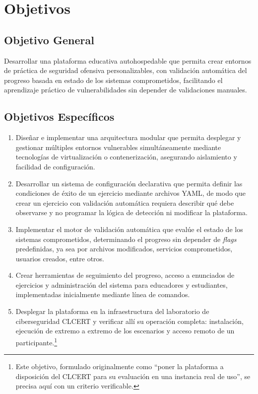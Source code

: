 \section{Objetivos}

\subsection{Objetivo General}

Desarrollar una plataforma educativa autohospedable que permita crear entornos
de práctica de seguridad ofensiva personalizables, con validación automática del
progreso basada en estado de los sistemas comprometidos, facilitando el
aprendizaje práctico de vulnerabilidades sin depender de validaciones manuales.

\subsection{Objetivos Específicos}

\begin{enumerate}
    \item Diseñar e implementar una arquitectura modular que permita desplegar y
    gestionar múltiples entornos vulnerables simultáneamente mediante
    tecnologías de virtualización o contenerización, asegurando aislamiento y
    facilidad de configuración.
    
    \item Desarrollar un sistema de configuración declarativa que permita
    definir las condiciones de éxito de un ejercicio mediante archivos YAML,
    de modo que crear un ejercicio con validación automática requiera
    describir qué debe observarse y no programar la lógica de detección ni
    modificar la plataforma.

    \item Implementar el motor de validación automática que evalúe el estado de
    los sistemas comprometidos, determinando el progreso sin depender de
    \textit{flags} predefinidas, ya sea por archivos modificados, servicios
    comprometidos, usuarios creados, entre otros.

    \item Crear herramientas de seguimiento del progreso, acceso a enunciados de
    ejercicios y administración del sistema para educadores y estudiantes,
    implementadas inicialmente mediante línea de comandos.

    \item Desplegar la plataforma en la infraestructura del laboratorio de
    ciberseguridad CLCERT y verificar allí su operación completa: instalación,
    ejecución de extremo a extremo de los escenarios y acceso remoto de un
    participante.\footnote{Este objetivo, formulado originalmente como ``poner
    la plataforma a disposición del CLCERT para su evaluación en una instancia
    real de uso'', se precisa aquí con un criterio verificable.}
\end{enumerate}

